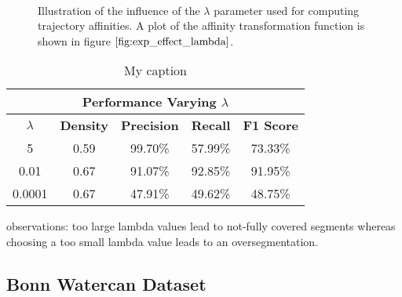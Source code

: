 \begin{figure}[H]
\begin{center}

~
~
\end{center}
\caption[Influence varying $\lambda$]{Illustration of the influence of the $\lambda$ parameter used for computing trajectory affinities. A plot of the affinity transformation function is shown in figure $\ref{fig:exp_effect_lambda}$. }
\label{fig:cars_dataset_lambdas}
\end{figure}


\begin{table}[H]
\centering
\begin{tabular}{|c|c|c|c|c|}
\hline
\multicolumn{5}{|c|}{Performance Varying $\lambda$}                        \\ \hline
$\lambda$              & \textbf{Density} & \textbf{Precision} & \textbf{Recall} & \textbf{F1 Score} \\ \hline
5 & 0.59 & 99.70\%   & 57.99\%     & 73.33\%  \\ \hline
0.01 & 0.67 & 91.07\%   & 92.85\%     & 91.95\%  \\ \hline              
0.0001 & 0.67 & 47.91\%   & 49.62\%     & 48.75\%  \\ \hline
\end{tabular}
\caption[Cars Varying $\lambda$]{My caption}
\label{tab:cars_varying_lambas}
\end{table}

observations:
too large lambda values lead to not-fully covered segments
whereas choosing a too small lambda value leads to an oversegmentation.


\subsection{Bonn Watercan Dataset}

